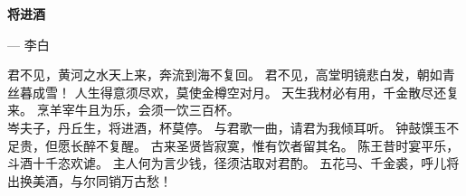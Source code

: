 \newpage
\begin{center}
\Large{\textbf{将进酒}} \vspace{2mm} \\
	\begin{flushright}
	---  李白\\
	\end{flushright}
\end{center}
\vspace{1mm}
\indent 君不见，黄河之水天上来，奔流到海不复回。
君不见，高堂明镜悲白发，朝如青丝暮成雪！
人生得意须尽欢，莫使金樽空对月。
天生我材必有用，千金散尽还复来。
烹羊宰牛且为乐，会须一饮三百杯。\\
\indent 岑夫子，丹丘生，将进酒，杯莫停。
与君歌一曲，请君为我倾耳听。
钟鼓馔玉不足贵，但愿长醉不复醒。
古来圣贤皆寂寞，惟有饮者留其名。
陈王昔时宴平乐，斗酒十千恣欢谑。
主人何为言少钱，径须沽取对君酌。
五花马、千金裘，呼儿将出换美酒，与尔同销万古愁！

